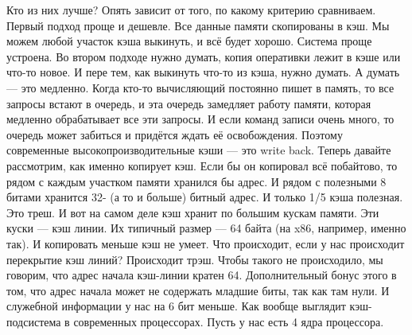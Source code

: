 \documentclass{article}
\begin{document}
    Кто из них лучше? Опять зависит от того, по какому критерию сравниваем. Первый подход проще и дешевле. Все данные памяти скопированы в кэш. Мы можем любой участок кэша выкинуть, и всё будет хорошо. Система проще устроена. Во втором подходе нужно думать, копия оперативки лежит в кэше или что-то новое. И пере тем, как выкинуть что-то из кэша, нужно думать. А думать --- это медленно. Когда кто-то вычисляющий постоянно пишет в память, то все запросы встают в очередь, и эта очередь замедляет работу памяти, которая медленно обрабатывает все эти запросы. И если команд записи очень много, то очередь может забиться и придётся ждать её освобождения. Поэтому современные высокопроизводительные кэши --- это write back. Теперь давайте рассмотрим, как именно копирует кэш. Если бы он копировал всё побайтово, то рядом с каждым участком памяти хранился бы адрес. И рядом с полезными 8 битами хранится 32- (а то и больше) битный адрес. И только 1/5 кэша полезная. Это треш. И вот на самом деле кэш хранит по большим кускам памяти. Эти куски --- кэш линии. Их типичный размер --- 64 байта (на x86, например, именно так). И копировать меньше кэш не умеет. Что происходит, если у нас происходит перекрытие кэш линий? Происходит трэш. Чтобы такого не происходило, мы говорим, что адрес начала кэш-линии кратен 64. Дополнительный бонус этого в том, что адрес начала может не содержать младшие биты, так как там нули. И служебной информации у нас на 6 бит меньше. Как вообще выглядит кэш-подсистема в современных процессорах. Пусть у нас есть 4 ядра процессора.
\end{document}
